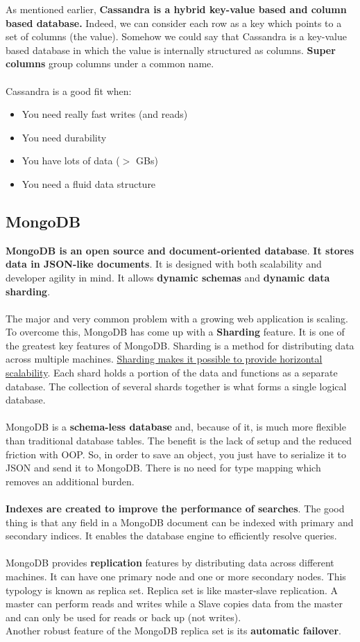 \documentclass[10pt,a4paper]{article}
\newcommand{\nline}{\\~\\}
\begin{document}
As mentioned earlier, \textbf{Cassandra is a hybrid key-value based and column based database.} Indeed, we can consider each row as a key which points to a set of columns (the value). Somehow we could say that Cassandra is a key-value based database in which the value is internally structured as columns.
\textbf{Super columns} group columns under a common name.
\nline
Cassandra is a good fit when:
\begin{itemize}
	\item You need really fast writes (and reads)
	\item You need durability
	\item You have lots of data ($>$ GBs)
	\item You need a fluid data structure
\end{itemize}

\subsection{MongoDB}
\textbf{MongoDB is an open source and document-oriented database}. \textbf{It stores data in JSON-like documents}. It is designed with both scalability and developer agility in mind. It allows \textbf{dynamic schemas} and \textbf{dynamic data sharding}.
\nline
The major and very common problem with a growing web application is scaling. To overcome this, MongoDB has come up with a \textbf{Sharding} feature. It is one of the greatest key features of MongoDB. Sharding is a method for distributing data across multiple machines.
\uline{Sharding makes it possible to provide horizontal scalability}. Each shard holds a portion of the data and functions as a separate database. The collection of several shards together is what forms a single logical database.
\nline
MongoDB is a \textbf{schema-less database} and, because of it, is much more flexible than traditional database tables. The benefit is the lack of setup and the reduced friction with OOP. So, in order to save an object, you just have to serialize it to JSON and send it to MongoDB. There is no need for type mapping which removes an additional burden.
\nline
\textbf{Indexes are created to improve the performance of searches}. The good thing is that any field in a MongoDB document can be indexed with primary and secondary indices. It enables the database engine to efficiently resolve queries.
\nline
MongoDB provides \textbf{replication} features by distributing data across different machines. It can have one primary node and one or more secondary nodes. This typology is known as replica set. Replica set is like master-slave replication. A master can perform reads and writes while a Slave copies data from the master and can only be used for reads or back up (not writes). \\ Another robust feature of the MongoDB replica set is its \textbf{automatic failover}.
\end{document}
